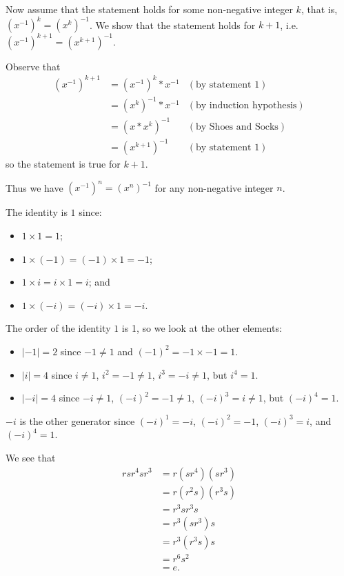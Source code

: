 \begin{questions}
    Now assume that the statement holds for some non-negative integer $k$, that is, $(x^{-1})^k = (x^k)^{-1}$. We show that the statement holds for $k + 1$, i.e. $(x^{-1})^{k+1} = (x^{k+1})^{-1}$.

    Observe that
    \begin{align*}
        (x^{-1})^{k+1} &= (x^{-1})^k \ast x^{-1} & (\text{by statement 1})\\
        &= (x^k)^{-1} \ast x^{-1} & (\text{by induction hypothesis})\\
        &= (x\ast x^k)^{-1} & (\text{by Shoes and Socks})\\
        &= (x^{k+1})^{-1} & (\text{by statement 1})
    \end{align*}
    so the statement is true for $k+1$.

    Thus we have $(x^{-1})^n = (x^n)^{-1}$ for any non-negative integer $n$.

    \item \begin{partquestions}{\roman*}
        \item The identity is $1$ since:
        \begin{itemize}
            \item $1 \times 1 = 1$;
            \item $1 \times (-1) = (-1) \times 1 = -1$;
            \item $1 \times i = i \times 1 = i$; and
            \item $1 \times (-i) = (-i) \times 1 = -i$.
        \end{itemize}
        \item The order of the identity $1$ is 1, so we look at the other elements:
        \begin{itemize}
            \item $|-1| = 2$ since $-1 \neq 1$ and $(-1)^2 = -1 \times -1 = 1$.
            \item $|i| = 4$ since $i \neq 1$, $i^2 = -1 \neq 1$, $i^3 = -i \neq 1$, but $i^4 = 1$.
            \item $|-i| = 4$ since $-i \neq 1$, $(-i)^2 = -1 \neq 1$, $(-i)^3 = i \neq 1$, but $(-i)^4 = 1$.
        \end{itemize}
    \end{partquestions}

    \item $-i$ is the other generator since $(-i)^1 = -i$, $(-i)^2 = -1$, $(-i)^3 = i$, and $(-i)^4 = 1$.

    \item We see that
    \begin{align*}
        rsr^4sr^3 &= r(sr^4)(sr^3)\\
        &= r(r^2s)(r^3s)\\
        &= r^3sr^3s\\
        &= r^3(sr^3)s\\
        &= r^3(r^3s)s\\
        &= r^6s^2\\
        &= e.
    \end{align*}
\end{questions}

